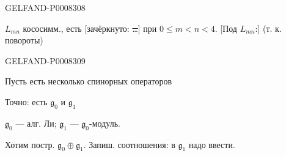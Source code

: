 \begin{GelfandAdjacentEvidence}{GELFAND-P000830}{8}


\(L_{mn}\) кососимм., есть [зачёркнуто: \sout{…}]
при \(0\le m<n<4\).
[Под \(L_{mn}\):] (т. к. повороты)
\end{GelfandAdjacentEvidence}
\begin{GelfandAdjacentEvidence}{GELFAND-P000830}{9}


\end{GelfandAdjacentEvidence}


Пусть есть несколько спинорных операторов

Точно: есть \(\mathfrak g_0\) и \(\mathfrak g_1\)

\(\mathfrak g_0\) — алг. Ли; \(\mathfrak g_1\) — \(\mathfrak g_0\)-модуль.

Хотим постр. \(\mathfrak g_0\oplus\mathfrak g_1\).
Запиш. соотношения: в \(\mathfrak g_1\) надо ввести.


